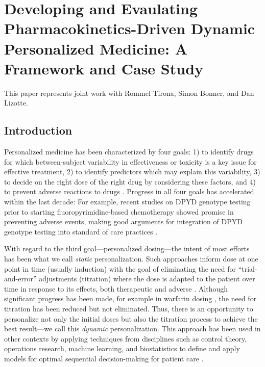\chapter[Developing and Evaluating PK-Driven Dynamic Personalized Medicine]{Developing and Evaulating Pharmacokinetics-Driven Dynamic Personalized Medicine: A Framework and Case Study}

This paper represents joint work with Rommel Tirona, Simon Bonner, and Dan Lizotte.

\section{Introduction}

Personalized medicine has been characterized by four goals: 1) to identify drugs for which between-subject variability in effectiveness or toxicity is a key issue for effective treatment, 2) to identify predictors which may explain this variability, 3) to decide on the right dose of the right drug by considering these factors, and 4) to prevent adverse reactions to drugs \cite{morse2015personalized}.  Progress in all four goals has accelerated within the last decade: For example, recent studies on DPYD genotype testing prior to starting fluoropyrimidine-based chemotherapy showed promise in preventing adverse events, making good arguments for integration of DPYD genotype testing into standard of care practices \cite{wigle2019prospective}.  

With regard to the third goal---personalized dosing---the intent of most efforts has been what we call \textit{static} personalization. Such approaches inform dose at one point in time (usually induction) with the goal of eliminating the need for ``trial-and-error'' adjustments (titration) where the dose is adapted to the patient over time in response to its effects, both therapeutic and adverse \cite{morse2015personalized}. Although significant progress has been made, for example in warfarin dosing \cite{gong2011prospective}, the need for titration has been reduced but not eliminated. Thus, there is an opportunity to personalize not only the initial doses but also the titration process to achieve the best result---we call this \textit{dynamic} personalization. This approach has been used in other contexts by applying techniques from disciplines such as control theory, operations research, machine learning, and biostatistics to define and apply models for optimal sequential decision-making for patient care \cite{zhang2021identifying, engelhardt2021importance}.

